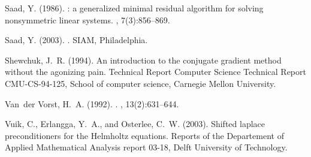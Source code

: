 \documentclass[10pt]{article}
\begin{document}
\begin{thebibliography}{}
Saad, Y. (1986).
: a generalized minimal residual algorithm for solving
  nonsymmetric linear systems.
,
  7(3):856--869.

Saad, Y. (2003).
.
\newblock SIAM, Philadelphia.

Shewchuk, J.~R. (1994).
\newblock An introduction to the conjugate gradient method without the
  agonizing pain.
\newblock Technical Report Computer Science Technical Report CMU-CS-94-125,
  School of computer science, Carnegie Mellon University.

Van~der Vorst, H.~A. (1992).
.
,
  13(2):631--644.

Vuik, C., Erlangga, Y.~A., and Osterlee, C.~W. (2003).
\newblock Shifted laplace preconditioners for the {H}elmholtz equations.
\newblock Reports of the Departement of Applied Mathematical Analysis report
  03-18, Delft University of Technology.

\end{thebibliography}
\end{document}
